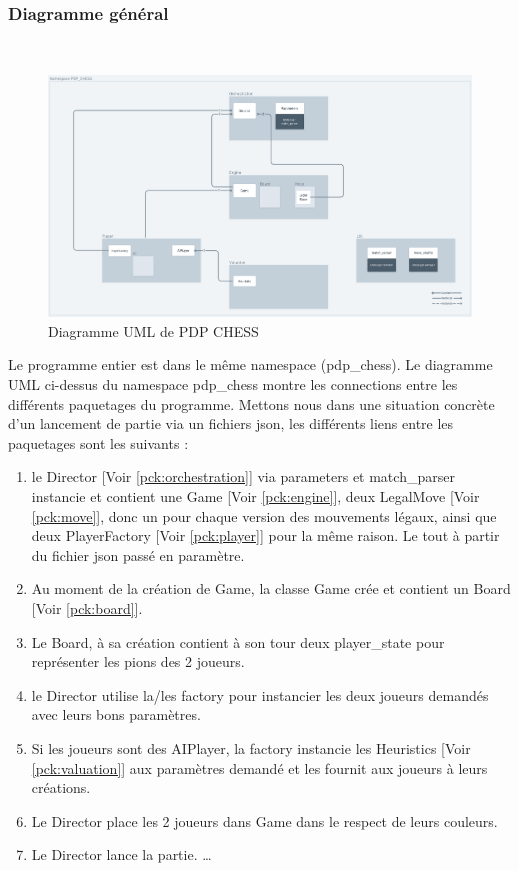 \huge\documentclass{article}
\begin{document}
\subsubsection{Diagramme général}
~~\\
\newline
\begin{figure}[!h]
    \centering
    \includegraphics[scale = 0.35]{img/Package/UML.png}
    \caption{Diagramme UML de PDP CHESS}
    \label{uml}
\end{figure}
\newline 
Le programme entier est dans le même namespace (pdp\_chess).
Le diagramme UML ci-dessus du namespace pdp\_chess montre les connections entre les différents paquetages du programme.
Mettons nous dans une situation concrète d'un lancement de partie via un fichiers json, les différents liens entre les paquetages sont les suivants :
\begin{enumerate}
    \item le Director [Voir \ref{pck:orchestration}] via parameters et match\_parser instancie et contient une Game [Voir \ref{pck:engine}], deux LegalMove [Voir \ref{pck:move}], donc un pour chaque version des mouvements légaux, ainsi que deux PlayerFactory [Voir \ref{pck:player}] pour la même raison. Le tout à partir du fichier json passé en paramètre.
    \item Au moment de la création de Game, la classe Game crée et contient un Board [Voir \ref{pck:board}].
    \item Le Board, à sa création contient à son tour deux player\_state pour représenter les pions des 2 joueurs.
    \item le Director utilise la/les factory pour instancier les deux joueurs demandés avec leurs bons paramètres.
    \item Si les joueurs sont des AIPlayer, la factory instancie les Heuristics [Voir \ref{pck:valuation}] aux paramètres demandé et les fournit aux joueurs à leurs créations.
    \item Le Director place les 2 joueurs dans Game dans le respect de leurs couleurs.
    \item Le Director lance la partie. \dots
\end{enumerate}
\end{document}
